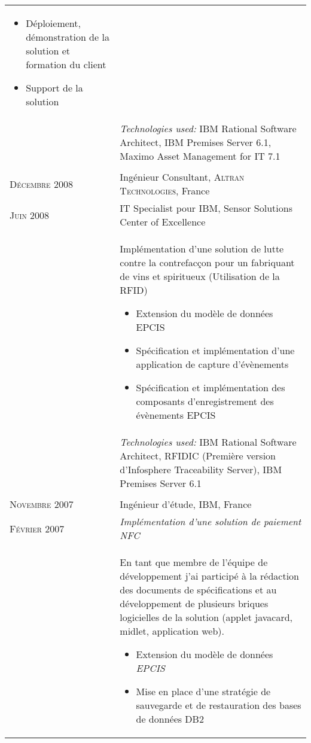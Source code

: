 \begin{longtable}{R{2.5cm}|p{14.8cm}}
{\begin{itemize}
			\item Déploiement, démonstration de la solution et formation du client
			\item Support de la solution
		\end{itemize}
		\vspace{-1em}
 	}\\&
 \footnotesize{\emph{Technologies used:} IBM Rational Software Architect, IBM Premises Server 6.1, Maximo Asset Management for IT 7.1 }\\ 	
   \\
 	\textsc{Décembre 2008} & Ingénieur Consultant, \textsc{Altran Technologies}, France\\
 	\textsc{Juin 2008}& IT Specialist pour IBM, Sensor Solutions Center of Excellence\\&
 	\footnotesize{
 	 	Implémentation d'une solution de lutte contre la contrefacçon pour un fabriquant de vins et spiritueux (Utilisation de la RFID)
 		\begin{itemize}
 		  	\item Extension du modèle de données EPCIS
 		  	\item Spécification et implémentation d'une application de capture d'évènements
 		  	\item Spécification et implémentation des  composants d'enregistrement des évènements EPCIS
		\end{itemize}
		\vspace{-1em}
 	}\\&
 \footnotesize{\emph{Technologies used:} IBM Rational Software Architect, RFIDIC (Première version d'Infosphere Traceability Server), IBM Premises Server 6.1 }\\
 \\
 	\textsc{Novembre 2007} & Ingénieur d'étude, \textsc{IBM}, France \\
 	\textsc{Février 2007}&\emph{Implémentation d'une solution de paiement NFC}\\&
 	\footnotesize{
 	 	En tant que membre de l'équipe de développement j'ai
 		participé à la rédaction des documents de spécifications et au développement de
 		plusieurs briques logicielles de la solution (applet javacard, midlet,
 		application web).
 	 	\begin{itemize}
			\item Extension du modèle de données \emph{EPCIS}
			\item Mise en place d'une stratégie de sauvegarde et de restauration des bases de données DB2

\end{itemize}}
\end{longtable}
